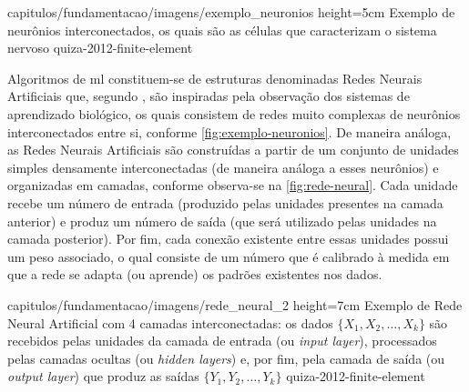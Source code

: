 


    {capitulos/fundamentacao/imagens/exemplo_neuronios} %
    {height=5cm} %
    {Exemplo de neurônios interconectados, os quais são as células que caracterizam o sistema nervoso} %
    {quiza-2012-finite-element} %


Algoritmos de \acrlong{ml} constituem-se de estruturas denominadas Redes Neurais Artificiais que, segundo , são inspiradas pela observação dos sistemas de aprendizado biológico, os quais consistem de redes muito complexas de neurônios interconectados entre si, conforme \autoref{fig:exemplo-neuronios}.
De maneira análoga, as Redes Neurais Artificiais são construídas a partir de um conjunto de unidades simples densamente interconectadas (de maneira análoga a esses neurônios) e organizadas em camadas, conforme observa-se na \autoref{fig:rede-neural}. Cada unidade recebe um número de entrada (produzido pelas unidades presentes na camada anterior) e produz um número de saída (que será utilizado pelas unidades na camada posterior). Por fim, cada conexão existente entre essas unidades possui um peso associado, o qual consiste de um número que é calibrado à medida em que a rede se adapta (ou aprende) os padrões existentes nos dados.

    {capitulos/fundamentacao/imagens/rede_neural_2} %
    {height=7cm} %
    {Exemplo de Rede Neural Artificial com 4 camadas interconectadas: os dados \(\{X_1, X_2, \dots, X_k\}\) são recebidos pelas unidades da camada de entrada (ou \textit{input layer}), processados pelas camadas ocultas (ou \textit{hidden layers}) e, por fim, pela camada de saída (ou \textit{output layer}) que produz as saídas \(\{Y_1, Y_2, \dots, Y_k\}\)} %
    {quiza-2012-finite-element} %


